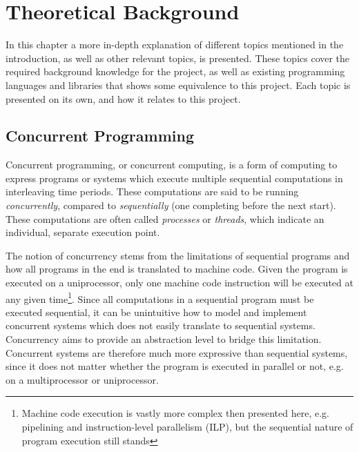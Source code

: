 

\chapter{Theoretical Background}
\label{ch:background}


In this chapter a more in-depth explanation of different topics mentioned in the introduction, as well as other relevant topics, is presented. These topics cover the required background knowledge for the project, as well as existing programming languages and libraries that shows some equivalence to this project. Each topic is presented on its own, and how it relates to this project. 


\section{Concurrent Programming}
\label{sec:concurrent_programming}


Concurrent programming, or concurrent computing, is a form of computing to express programs or systems which execute multiple sequential computations in interleaving time periods. These computations are said to be running \textit{concurrently}, compared to \textit{sequentially} (one completing before the next start). These computations are often called \textit{processes} or \textit{threads}, which indicate an individual, separate execution point. 

The notion of concurrency stems from the limitations of sequential programs and how all programs in the end is translated to machine code. Given the program is executed on a uniprocessor, only one machine code instruction will be executed at any given time\footnote{Machine code execution is vastly more complex then presented here, e.g. pipelining and instruction-level parallelism (ILP), but the sequential nature of program execution still stands}.  Since all computations in a sequential program must be executed sequential, it can be unintuitive how to model and implement concurrent systems which does not easily translate to sequential systems. Concurrency aims to provide an abstraction level to bridge this limitation. Concurrent systems are therefore much more expressive than sequential systems, since it does not matter whether the program is executed in parallel or not, e.g. on a multiprocessor or uniprocessor.

